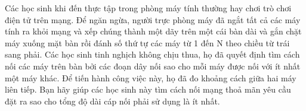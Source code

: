 Các học sinh khi đến thực tập trong phòng máy tính thường hay chơi trò chơi điện tử trên mạng. Để ngăn ngừa, người trực phòng máy đã ngắt tất cả các máy tính ra khỏi mạng và xếp chúng thành một dãy trên một cái bàn dài và gắn chặt máy xuống mặt bàn rồi đánh số thứ tự các máy từ 1 đến N theo chiều từ trái sang phải. Các học sinh tinh nghịch không chịu thua, họ đã quyết định tìm cách nối các máy trên bàn bởi các đoạn dây nối sao cho mỗi máy được nối với ít nhất một máy khác. Để tiến hành công việc này, họ đã đo khoảng cách giữa hai máy liên tiếp. Bạn hãy giúp các học sinh này tìm cách nối mạng thoả mãn yêu cầu đặt ra sao cho tổng độ dài cáp nối phải sử dụng là ít nhất.
